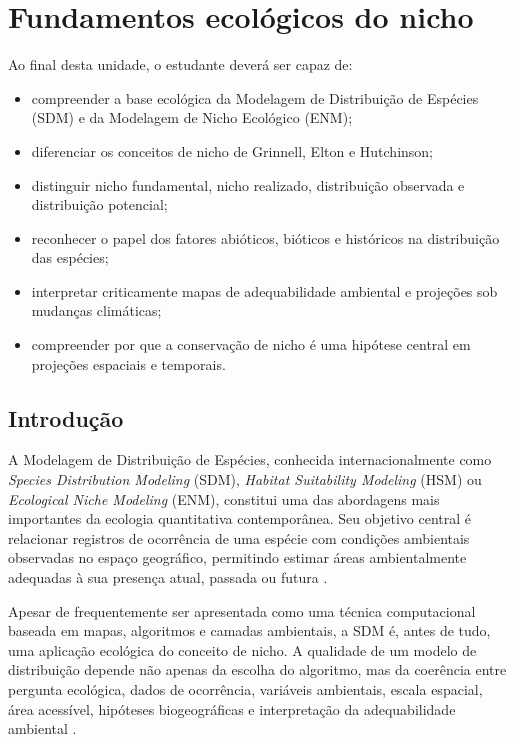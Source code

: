 \chapter{Fundamentos ecológicos do nicho}

\begin{objetivos}
Ao final desta unidade, o estudante deverá ser capaz de:
\begin{itemize}
  \item compreender a base ecológica da Modelagem de Distribuição de Espécies (SDM) e da Modelagem de Nicho Ecológico (ENM);
  \item diferenciar os conceitos de nicho de Grinnell, Elton e Hutchinson;
  \item distinguir nicho fundamental, nicho realizado, distribuição observada e distribuição potencial;
  \item reconhecer o papel dos fatores abióticos, bióticos e históricos na distribuição das espécies;
  \item interpretar criticamente mapas de adequabilidade ambiental e projeções sob mudanças climáticas;
  \item compreender por que a conservação de nicho é uma hipótese central em projeções espaciais e temporais.
\end{itemize}
\end{objetivos}

\section{Introdução}

A Modelagem de Distribuição de Espécies, conhecida internacionalmente como \textit{Species Distribution Modeling} (SDM), \textit{Habitat Suitability Modeling} (HSM) ou \textit{Ecological Niche Modeling} (ENM), constitui uma das abordagens mais importantes da ecologia quantitativa contemporânea. Seu objetivo central é relacionar registros de ocorrência de uma espécie com condições ambientais observadas no espaço geográfico, permitindo estimar áreas ambientalmente adequadas à sua presença atual, passada ou futura \parencite{guisan2000,guisan2005predicting,guisan2017habitat,elith2009,franklin2010}.

Apesar de frequentemente ser apresentada como uma técnica computacional baseada em mapas, algoritmos e camadas ambientais, a SDM é, antes de tudo, uma aplicação ecológica do conceito de nicho. A qualidade de um modelo de distribuição depende não apenas da escolha do algoritmo, mas da coerência entre pergunta ecológica, dados de ocorrência, variáveis ambientais, escala espacial, área acessível, hipóteses biogeográficas e interpretação da adequabilidade ambiental \parencite{peterson2011,guisan2017habitat,barve2011crucial}.


